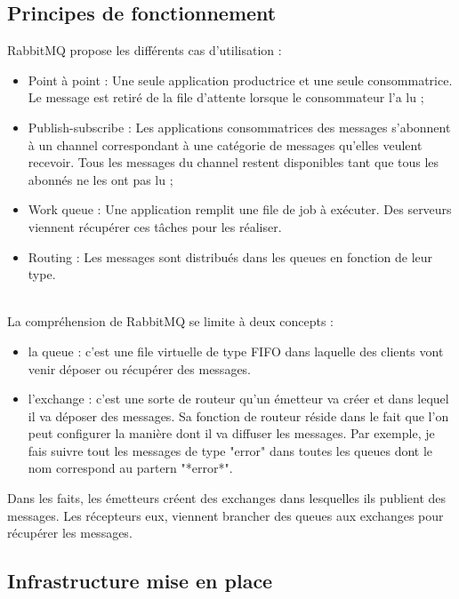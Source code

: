 \subsection{Principes de fonctionnement}

RabbitMQ propose les différents cas d'utilisation :
\begin{itemize}
	\item Point à point : Une seule application productrice et une seule consommatrice. Le message est retiré de la file d’attente lorsque le consommateur l’a lu ;
	\item Publish-subscribe : Les applications consommatrices des messages s'abonnent à un channel correspondant à une catégorie de messages qu’elles veulent recevoir. Tous les messages du channel restent disponibles tant que tous les abonnés ne les ont pas lu ;
	\item Work queue : Une application remplit une file de job à exécuter. Des serveurs viennent récupérer ces tâches pour les réaliser.
	\item Routing : Les messages sont distribués dans les queues en fonction de leur type.
\end{itemize}
\ \\
La compréhension de RabbitMQ se limite à deux concepts :
\begin{itemize}
	\item la queue : c'est une file virtuelle de type FIFO dans laquelle des clients vont venir déposer ou récupérer des messages.
	\item l'exchange : c'est une sorte de routeur qu'un émetteur va créer et dans lequel il va déposer des messages. Sa fonction de routeur réside dans le fait que l'on peut configurer la manière dont il va diffuser les messages. Par exemple, je fais suivre tout les messages de type "error" dans toutes les queues dont le nom correspond au partern "*error*".
\end{itemize}
Dans les faits, les émetteurs créent des exchanges dans lesquelles ils publient des messages. Les récepteurs eux, viennent brancher des queues aux exchanges pour récupérer les messages.

\subsection{Infrastructure mise en place}

